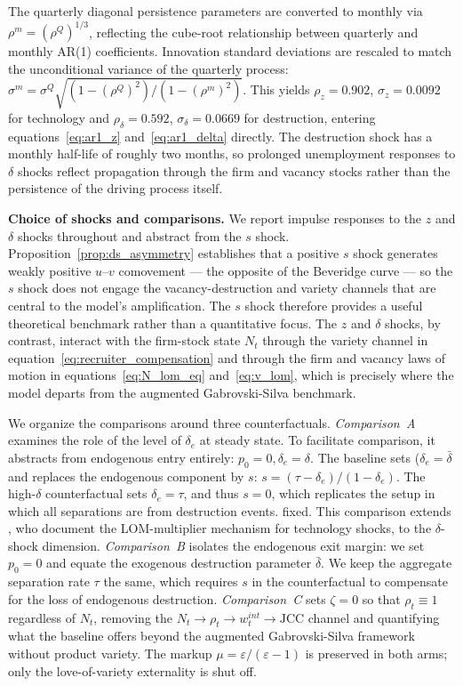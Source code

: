 \documentclass[authoryear, review, 12pt]{elsarticle}
\begin{document}
	The quarterly diagonal persistence parameters are converted to
	monthly via $\rho^m=(\rho^Q)^{1/3}$, reflecting the cube-root
	relationship between quarterly and monthly AR(1) coefficients.
	Innovation standard deviations are rescaled to match the
	unconditional variance of the quarterly process:
	$\sigma^m = \sigma^Q\sqrt{(1-(\rho^Q)^2)/(1-(\rho^m)^2)}$.
	This yields $\rho_z=0.902$, $\sigma_z=0.0092$ for technology and
	$\rho_\delta=0.592$, $\sigma_\delta=0.0669$ for destruction,
	entering equations~\eqref{eq:ar1_z} and~\eqref{eq:ar1_delta}
	directly.
	The destruction shock has a monthly half-life of roughly two months,
	so prolonged unemployment responses to $\delta$ shocks reflect
	propagation through the firm and vacancy stocks rather than the
	persistence of the driving process itself.

	\medskip\noindent\textbf{Choice of shocks and comparisons.}
	We report impulse responses to the $z$ and $\delta$ shocks
	throughout and abstract from the $s$ shock.
	Proposition~\ref{prop:ds_asymmetry} establishes that a positive
	$s$ shock generates weakly positive $u$--$v$ comovement ---
	the opposite of the Beveridge curve --- so the $s$ shock does not
	engage the vacancy-destruction and variety channels that are central
	to the model's amplification.
	The $s$ shock therefore provides a useful theoretical benchmark
	rather than a quantitative focus.
	The $z$ and $\delta$ shocks, by contrast, interact with the
	firm-stock state $N_t$ through the variety channel in
	equation~\eqref{eq:recruiter_compensation} and through the firm
	and vacancy laws of motion in equations~\eqref{eq:N_lom_eq}
	and~\eqref{eq:v_lom}, which is precisely where the model departs
	from the augmented Gabrovski-Silva benchmark.

	We organize the comparisons around three counterfactuals.
	\emph{Comparison~A} examines the role of the level of $\delta_e$
	at steady state. To facilitate comparison, it abstracts from endogenous entry entirely: $p_0=0, \delta_e=\delta$. The baseline sets ($\delta_e=\bar{\delta}$ and replaces the endogenous component by $s$: $s=(\tau-\delta_e)/(1-\delta_e)$. The
 high-$\delta$ counterfactual sets $\delta_e=\tau$, and thus $s=0$, which replicates the \citet{coles_2018} setup in which all separations are from destruction events.
	fixed. This comparison extends \citet{gabrovski_2025},
	who document the LOM-multiplier mechanism for technology shocks, to the $\delta$-shock dimension.
	\emph{Comparison~B} isolates the endogenous exit margin: we set $p_0=0$ and equate the exogenous destruction
	parameter $\bar\delta$. We keep the aggregate separation rate $\tau$ the same, which requires $s$ in the counterfactual to compensate for the loss of endogenous destruction. 
	\emph{Comparison~C} sets $\zeta=0$ so that
	$\rho_t\equiv1$ regardless of $N_t$, removing the
	$N_t\to\rho_t\to w_t^{int}\to\mathrm{JCC}$ channel and
	quantifying what the baseline offers beyond the augmented
	Gabrovski-Silva framework without product variety.
	The markup $\mu=\varepsilon/(\varepsilon-1)$ is preserved in both arms;
	only the love-of-variety externality is shut off.
\end{document}
